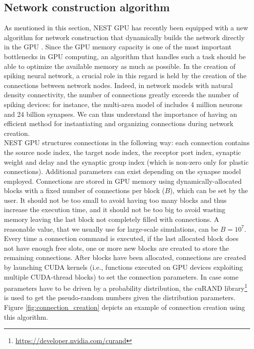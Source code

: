 \documentclass[a4paper, 12pt, twoside, openright]{book}
\begin{document}
\subsection{Network construction algorithm}
As mentioned in this section, NEST GPU has recently been equipped with a new algorithm for network construction that dynamically builds the network directly in the GPU \cite{Golosio2023}. 
Since the GPU memory capacity is one of the most important bottlenecks in GPU computing, an algorithm that handles such a task should be able to optimize the available memory as much as possible. In the creation of spiking neural network, a crucial role in this regard is held by the creation of the connections between network nodes. Indeed, in network models with natural density connectivity, the number of connections greatly exceeds the number of spiking devices: for instance, the multi-area model of \cite{Schuecker2017, Schmidt2018b, Schmidt2018} includes 4 million neurons and 24 billion synapses. We can thus understand the importance of having an efficient method for instantiating and organizing connections during network creation.\\
NEST GPU structures connections in the following way: each connection contains the source node index, the target node index, the receptor port index, synaptic weight and delay and the synaptic group index (which is non-zero only for plastic connections). Additional parameters can exist depending on the synapse model employed. Connections are stored in GPU memory using dynamically-allocated blocks with a fixed number of connections per block ($B$), which can be set by the user. It should not be too small to avoid having too many blocks and thus increase the execution time, and it should not be too big to avoid wasting memory leaving the last block not completely filled with connections. A reasonable value, that we usually use for large-scale simulations, can be $B=10^7$.\\
Every time a connection command is executed, if the last allocated block does not have enough free slots, one or more new blocks are created to store the remaining connections. 
After blocks have been allocated, connections are created by launching CUDA kernels (i.e., functions executed on GPU devices exploiting multiple CUDA-thread blocks) to set the connection parameters. In case some parameters have to be driven by a probability distribution, the cuRAND library\footnote{\url{https://developer.nvidia.com/curand}} is used to get the pseudo-random numbers given the distribution parameters. Figure \ref{fig:connection_creation} depicts an example of connection creation using this algorithm.
\end{document}
